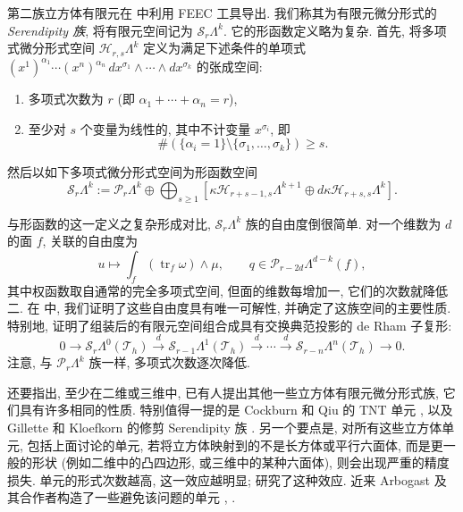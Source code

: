 {第二族立方体有限元在  中利用 FEEC 工具导出. 我们称其为有限元微分形式的\emph{Serendipity 族}, 将有限元空间记为 $\mathcal S_r\Lambda^k$. 它的形函数定义略为复杂. 首先, 将多项式微分形式空间 $\mathcal H_{r,s}\Lambda^k$ 定义为满足下述条件的单项式 $(x^1)^{\alpha_1}\cdots(x^n)^{\alpha_n}\,dx^{\sigma_1}\wedge\cdots\wedge dx^{\sigma_k}$ 的张成空间:}
\begin{enumerate}
\item{多项式次数为 $r$ (即 $\alpha_1+\cdots+\alpha_n=r$),}
\item{至少对 $s$ 个变量为线性的, 其中不计变量 $x^{\sigma_i}$, 即}
\[
\#(\{\alpha_i=1\}\setminus\{\sigma_1,\ldots,\sigma_k\})\geq s.
\]
\end{enumerate}
{然后以如下多项式微分形式空间为形函数空间}
\[
\mathcal S_r\Lambda^k:=\mathcal P_r\Lambda^k\oplus\bigoplus_{s\geq1}[\kappa\mathcal H_{r+s-1,s}\Lambda^{k+1}\oplus d\kappa\mathcal H_{r+s,s}\Lambda^k].
\]

{与形函数的这一定义之复杂形成对比, $\mathcal S_r\Lambda^k$ 族的自由度倒很简单. 对一个维数为 $d$ 的面 $f$, 关联的自由度为}
\[
u\mapsto\int_f(\operatorname{tr}_f\omega)\wedge\mu,\qquad q\in\mathcal P_{r-2d}\Lambda^{d-k}(f),
\]
{其中权函数取自通常的完全多项式空间, 但面的维数每增加一, 它们的次数就降低二. 在  中, 我们证明了这些自由度具有唯一可解性, 并确定了这族空间的主要性质. 特别地, 证明了组装后的有限元空间组合成具有交换典范投影的 de Rham 子复形:}
\[
0\to\mathcal S_r\Lambda^0(\mathcal T_h)\xrightarrow{d}\mathcal S_{r-1}\Lambda^1(\mathcal T_h)\xrightarrow{d}\cdots\xrightarrow{d}\mathcal S_{r-n}\Lambda^n(\mathcal T_h)\to0.
\]
{注意, 与 $\mathcal P_r\Lambda^k$ 族一样, 多项式次数逐次降低.}

{还要指出, 至少在二维或三维中, 已有人提出其他一些立方体有限元微分形式族, 它们具有许多相同的性质. 特别值得一提的是 Cockburn 和 Qiu 的 TNT 单元 , 以及 Gillette 和 Kloefkorn 的修剪 Serendipity 族 . 另一个要点是, 对所有这些立方体单元, 包括上面讨论的单元, 若将立方体映射到的不是长方体或平行六面体, 而是更一般的形状 (例如二维中的凸四边形, 或三维中的某种六面体), 则会出现严重的精度损失. 单元的形式次数越高, 这一效应越明显;  研究了这种效应. 近来 Arbogast 及其合作者构造了一些避免该问题的单元 , .}

